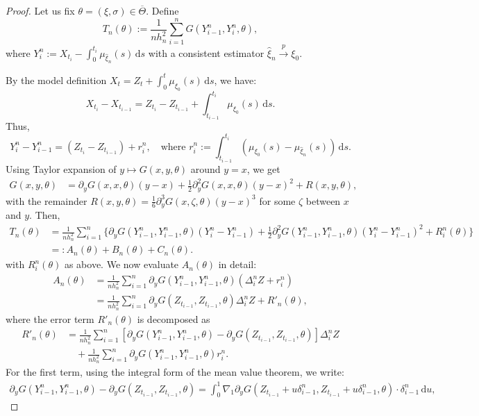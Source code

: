 \documentclass[10pt,a4paper]{amsart}
\def\df{\mathrm{d}}
\def\l{\left}
\def\ol#1{\overline{#1}}
\def\p{\partial}
\def\r{\right}
\def\toP{\stackrel{p}{\longrightarrow}}
\def\wh#1{\widehat{#1}}
\begin{document}
\begin{proof}
Let us fix \( \theta = (\xi, \sigma) \in \ol{\Theta} \). Define
\[
T_n(\theta) := \frac{1}{n h_n^2} \sum_{i=1}^n G\l(Y_{i-1}^n, Y_i^n, \theta\r),
\]
where \( Y_i^n := X_{t_i} - \int_0^{t_i} \mu_{\wh{\xi}_n}(s)\,\df s \) with a consistent estimator \( \wh{\xi}_n \toP \xi_0 \).

By the model definition \( X_t = Z_t + \int_0^t \mu_{\xi_0}(s)\,\df s \), we have:
\[
X_{t_i} - X_{t_{i-1}} = Z_{t_i} - Z_{t_{i-1}} + \int_{t_{i-1}}^{t_i} \mu_{\xi_0}(s)\,\df s.
\]
Thus,
\[
Y_i^n - Y_{i-1}^n = (Z_{t_i} - Z_{t_{i-1}}) + r_i^n, \quad\text{where } r_i^n := \int_{t_{i-1}}^{t_i} (\mu_{\xi_0}(s) - \mu_{\wh{\xi}_n}(s))\,\df s.
\]
Using Taylor expansion of \( y \mapsto G(x,y,\theta) \) around \( y = x \), we get
\begin{align*}
G(x,y,\theta) &= \p_y G(x,x,\theta)(y - x) + \frac{1}{2} \p_y^2 G(x,x,\theta)(y - x)^2 + R(x,y,\theta),
\end{align*}
with the remainder \( R(x,y,\theta) = \frac{1}{6} \p_y^3 G(x, \zeta, \theta)(y - x)^3 \) for some \( \zeta \) between \( x \) and \( y \). Then,
\begin{align*}
T_n(\theta) &= \frac{1}{n h_n^2} \sum_{i=1}^n \Bigg\{ \p_y G(Y_{i-1}^n, Y_{i-1}^n, \theta)(Y_i^n - Y_{i-1}^n) + \frac{1}{2} \p_y^2 G(Y_{i-1}^n, Y_{i-1}^n, \theta)(Y_i^n - Y_{i-1}^n)^2 + R_i^n(\theta) \Bigg\} \\
&=: A_n(\theta)  + B_n(\theta) + C_n(\theta). 
\end{align*}
with \( R_i^n(\theta) \) as above. We now evaluate \( A_n(\theta) \) in detail:
\begin{align*}
A_n(\theta) &= \frac{1}{n h_n^2} \sum_{i=1}^n \p_y G(Y_{i-1}^n, Y_{i-1}^n, \theta)(\Delta_i^n Z + r_i^n) \\
&= \frac{1}{n h_n^2} \sum_{i=1}^n \p_y G(Z_{t_{i-1}}, Z_{t_{i-1}}, \theta) \Delta_i^n Z + R'_n(\theta),
\end{align*}
where the error term \( R'_n(\theta) \) is decomposed as
\begin{align*}
R'_n(\theta) &= \frac{1}{n h_n^2} \sum_{i=1}^n \l[ \p_y G(Y_{i-1}^n, Y_{i-1}^n, \theta) - \p_y G(Z_{t_{i-1}}, Z_{t_{i-1}}, \theta) \r] \Delta_i^n Z \\
&\quad + \frac{1}{n h_n^2} \sum_{i=1}^n \p_y G(Y_{i-1}^n, Y_{i-1}^n, \theta) r_i^n.
\end{align*}
For the first term, using the integral form of the mean value theorem, we write:
\begin{align*}
\p_y G(Y_{i-1}^n, Y_{i-1}^n, \theta) - \p_y G(Z_{t_{i-1}}, Z_{t_{i-1}}, \theta) = \int_0^1 \nabla_1 \p_y G(Z_{t_{i-1}} + u \delta_{i-1}^n, Z_{t_{i-1}} + u \delta_{i-1}^n, \theta) \cdot \delta_{i-1}^n \,\df u,

\end{align*}
\end{proof}
\end{document}
